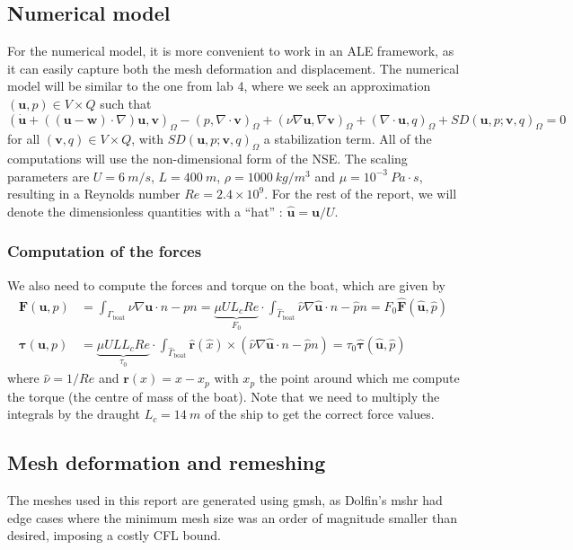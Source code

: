 \documentclass[a4paper]{article}
\newcommand{\bhu}{{\bm{\hat{u}}}}
\begin{document}
\subsection{Numerical model}
For the numerical model, it is more convenient to work in an ALE framework, as it can easily capture both the mesh deformation and displacement. The numerical model will be similar to the one from lab 4, where we seek an approximation $(\bm{u}, p) \in V \times Q$ such that
\[
	\left(\bm{\Dot{u}} + ((\bm{u}-\bm{w}) \cdot \nabla) \bm{u}, \bm{v}\right)_\Omega - (p,\nabla \cdot \bm{v})_\Omega + (\nu \nabla \bm{u},\nabla \bm{v})_\Omega + (\nabla \cdot \bm{u}, q)_\Omega + SD(\bm{u},p;\bm{v},q)_\Omega = 0
\]
for all $(\bm{v}, q) \in V \times Q$, with $SD(\bm{u},p;\bm{v},q)_\Omega$ a stabilization term. All of the computations will use the non-dimensional form of the NSE. The scaling parameters are $U=\SI{6}{m/s}$, $L=\SI{400}{m}$, $\rho = \SI{1000}{kg/m^3}$ and $\mu = 10^{-3}\ \si{Pa\cdot s}$, resulting in a Reynolds number $Re = 2.4 \times 10^{9}$. For the rest of the report, we will denote the dimensionless quantities with a ``hat'' : $\bhu = \bm{u}/U$. 

\subsubsection{Computation of the forces}
We also need to compute the forces and torque on the boat, which are given by
\begin{align}
	\bm{F}(\bm{u}, p)   &= \int_{\Gamma_\text{boat}} \nu \nabla \bm{u} \cdot n - pn = \underbrace{\mu U L_c Re}_{F_0} \cdot \int_{\hat{\Gamma}_\text{boat}} \hat{\nu} \nabla \bhu \cdot n - \hat{p} n = F_0 \bm{\hat{F}}(\bhu, \hat{p}) \label{eq:forces}\\[2mm]
	\bm{\tau}(\bm{u},p) &= \underbrace{\mu U LL_c Re}_{\tau_0} \cdot \int_{\hat{\Gamma}_\text{boat}} \bm{\hat{r}}(\hat{x}) \times (\hat{\nu} \nabla \bhu \cdot n - \hat{p}n) = \tau_0 \bm{\hat{\tau}}(\bhu, \hat{p}) \label{eq:torque}
\end{align}
where $\hat{\nu} = 1/Re$ and $\bm{r}(x) = x - x_p$ with $x_p$ the point around which me compute the torque (the centre of mass of the boat). Note that we need to multiply the integrals by the draught $L_c=\SI{14}{m}$ of the ship to get the correct force values.


\subsection{Mesh deformation and remeshing}
The meshes used in this report are generated using gmsh, as Dolfin's mshr had edge cases where the minimum mesh size was an order of magnitude smaller than desired, imposing a costly CFL bound.
\end{document}
